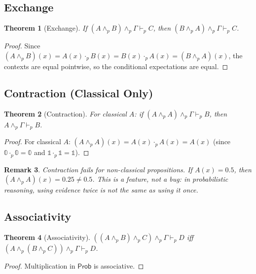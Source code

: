 \documentclass[11pt,a4paper]{article}
\newtheorem{theorem}{Theorem}[section]
\newtheorem{remark}[theorem]{Remark}
\newcommand{\Prob}{\mathsf{Prob}}
\newcommand{\pand}{\wedge_p}
\newcommand{\pzero}{\mathbb{0}}
\newcommand{\pone}{\mathbb{1}}
\newcommand{\pmul}{\cdot_p}
\newcommand{\entails}[1]{\vdash_{#1}}
\begin{document}
\subsection{Exchange}

\begin{theorem}[Exchange]
If $(A \pand B) \pand \Gamma \entails{p} C$, then $(B \pand A) \pand \Gamma \entails{p} C$.
\end{theorem}

\begin{proof}
Since $(A \pand B)(x) = A(x) \pmul B(x) = B(x) \pmul A(x) = (B \pand A)(x)$, the contexts are equal pointwise, so the conditional expectations are equal.
\end{proof}

\subsection{Contraction (Classical Only)}

\begin{theorem}[Contraction]
For classical $A$: if $(A \pand A) \pand \Gamma \entails{p} B$, then $A \pand \Gamma \entails{p} B$.
\end{theorem}

\begin{proof}
For classical $A$: $(A \pand A)(x) = A(x) \pmul A(x) = A(x)$ (since $\pzero \pmul \pzero = \pzero$ and $\pone \pmul \pone = \pone$).
\end{proof}

\begin{remark}
Contraction \emph{fails} for non-classical propositions. If $A(x) = 0.5$, then $(A \pand A)(x) = 0.25 \neq 0.5$. This is a feature, not a bug: in probabilistic reasoning, using evidence twice is not the same as using it once.
\end{remark}

\subsection{Associativity}

\begin{theorem}[Associativity]
$((A \pand B) \pand C) \pand \Gamma \entails{p} D$ iff $(A \pand (B \pand C)) \pand \Gamma \entails{p} D$.
\end{theorem}

\begin{proof}
Multiplication in $\Prob$ is associative.
\end{proof}
\end{document}
